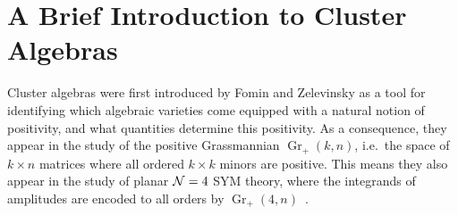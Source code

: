 \documentclass[11pt]{article}
\DeclareMathOperator{\Gr}{Gr}
\begin{document}





\section{A Brief Introduction to Cluster Algebras} \label{sec:brief_intro}

Cluster algebras were first introduced by Fomin and Zelevinsky \cite{1021.16017} as a tool for identifying which algebraic varieties come equipped with a natural notion of positivity, and what quantities determine this positivity. As a consequence, they appear in the study of the positive Grassmannian $\Gr_{+}(k,n)$, i.e.~the space of $k\times n$ matrices where all ordered $k\times k$ minors are positive. This means they also appear in the study of planar ${\cal N} = 4$ SYM theory, where the integrands of amplitudes are encoded to all orders by $\Gr_+(4,n)$~\cite{ArkaniHamed:2012nw}.
\end{document}
